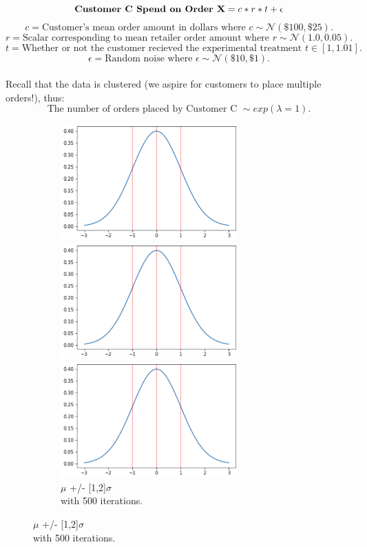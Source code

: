 \documentclass[12pt]{article}
\begin{document}
\[\text{\bf{Customer C Spend on Order X}} = c*r*t + \epsilon \]
\[c = \text{Customer's mean order amount in dollars where } c \sim \mathcal{N}(\$100,\$25).\]
\[r = \text{Scalar corresponding to mean retailer order amount where } r \sim \mathcal{N}(1.0,0.05).\]
\[t = \text{Whether or not the customer recieved the experimental treatment } t \in [1,1.01].\]
\[\epsilon = \text{Random noise where } \epsilon \sim \mathcal{N}(\$10,\$1).\]
\\
\indent\indent Recall that the data is clustered (we aspire for customers to place multiple orders!), thus:
\[\text{The number of orders placed by Customer C }  \sim exp(\lambda = 1).\]



\noindent
\begin{figure}[b]
\centering
\begin{subfigure}{.32\textwidth}
    \centering
    \includegraphics[width=0.75\textwidth]{sd_3.png}
    \caption[short]{$\mu$ +/- [1]$\sigma$ \\with 500 iterations.}
    \includegraphics[width=0.75\textwidth]{sd_3.png}
    \caption[short]{$\mu$ +/- [1,2]$\sigma$ \\with 500 iterations.}
    \includegraphics[width=0.75\textwidth]{sd_3.png}

\end{subfigure}
\end{figure}
\end{document}
